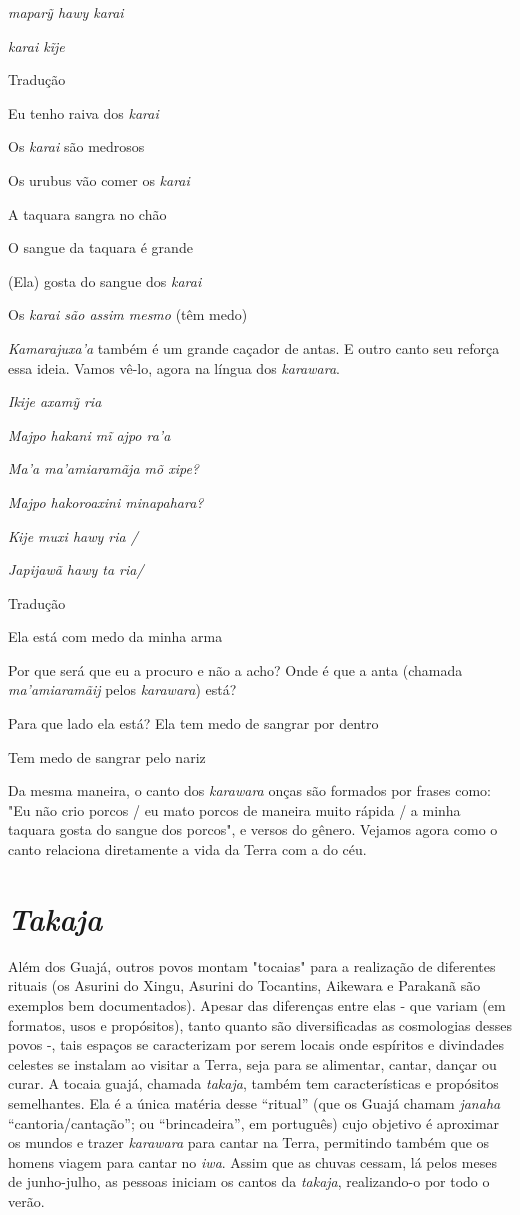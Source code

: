 \emph{maparỹ hawy karai}

\emph{karai kĩje}

Tradução

Eu tenho raiva dos \emph{karai}

Os \emph{karai} são medrosos

Os urubus vão comer os \emph{karai}

A taquara sangra no chão

O sangue da taquara é grande

(Ela) gosta do sangue dos \emph{karai}

Os \emph{karai são assim mesmo} (têm medo)

\emph{Kamarajuxa'a} também é um grande caçador de antas. E outro canto
seu reforça essa ideia. Vamos vê-lo, agora na língua dos
\emph{karawara}.

\emph{Ikije axamỹ ria }

\emph{Majpo hakani mĩ ajpo ra'a }

\emph{Ma'a ma'amiaramãja mõ xipe? }

\emph{Majpo hakoroaxini minapahara? }

\emph{Kije muxi hawy ria /}

\emph{Japijawã hawy ta ria/ }

Tradução

Ela está com medo da minha arma

Por que será que eu a procuro e não a acho? Onde é que a anta (chamada
\emph{ma'amiaramãij} pelos \emph{karawara}) está?

Para que lado ela está? Ela tem medo de sangrar por dentro

Tem medo de sangrar pelo nariz

Da mesma maneira, o canto dos \emph{karawara} onças são formados por
frases como: "Eu não crio porcos / eu mato porcos de maneira muito
rápida / a minha taquara gosta do sangue dos porcos", e versos do
gênero. Vejamos agora como o canto relaciona diretamente a vida da Terra
com a do céu.

\section{\emph{Takaja}}\label{takaja}

Além dos Guajá, outros povos montam "tocaias" para a realização de
diferentes rituais (os Asurini do Xingu, Asurini do Tocantins, Aikewara
e Parakanã são exemplos bem documentados). Apesar das diferenças entre
elas - que variam (em formatos, usos e propósitos), tanto quanto são
diversificadas as cosmologias desses povos -, tais espaços se
caracterizam por serem locais onde espíritos e divindades celestes se
instalam ao visitar a Terra, seja para se alimentar, cantar, dançar ou
curar. A tocaia guajá, chamada \emph{takaja}, também tem características
e propósitos semelhantes. Ela é a única matéria desse ``ritual'' (que os
Guajá chamam \emph{janaha} ``cantoria/cantação''; ou ``brincadeira'', em
português) cujo objetivo é aproximar os mundos e trazer \emph{karawara}
para cantar na Terra, permitindo também que os homens viagem para cantar
no \emph{iwa}. Assim que as chuvas cessam, lá pelos meses de
junho-julho, as pessoas iniciam os cantos da \emph{takaja}, realizando-o
por todo o verão.

